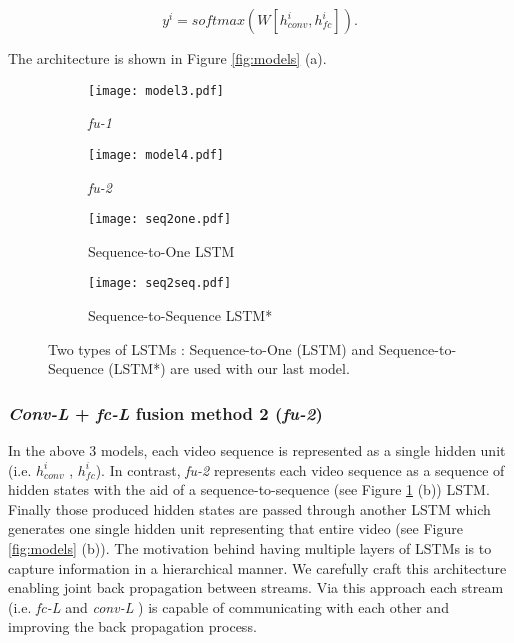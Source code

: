 \documentclass[10pt,twocolumn,letterpaper]{article}
\begin{document}
\begin{equation}
y^i=softmax( W [h^i_{conv},h^i_{fc}] ).
\label{eq:7}
\end{equation}

The architecture is shown in Figure \ref{fig:models} (a).

\begin{figure}[t!]
    \centering
    \begin{subfigure}{.45\columnwidth}
        \texttt{[image: model3.pdf]} %
        \caption{\textit{fu-1}}
    \end{subfigure}
    \begin{subfigure}{.45\columnwidth}
        \texttt{[image: model4.pdf]}
        \caption{\textit{fu-2}}
         \end{subfigure}
         \vspace{-3 mm}
         \caption{Simplified diagrams of last two models \textit{fu-1} (left) and \textit{fu-2} (right)} 
          \label{fig:models}
    \begin{subfigure}{.9\columnwidth}
        \texttt{[image: seq2one.pdf]} %
        \vspace{-5 mm}
        \caption{Sequence-to-One LSTM}
    \end{subfigure}
    \begin{subfigure}{.9\columnwidth}
        \texttt{[image: seq2seq.pdf]}
        \vspace{-2 mm}
        \caption{Sequence-to-Sequence LSTM*}
         \end{subfigure}

         \caption{Two types of LSTMs : Sequence-to-One (LSTM) and Sequence-to-Sequence (LSTM*) are used with our last model. }
        \label{fig:lstms}
\end{figure}

\subsubsection{\textit{Conv-L} + \textit{fc-L} fusion method 2 (\textit{fu-2})}

In the above 3 models, each video sequence is represented as a single hidden unit (i.e. $h^i_{conv}$ , $h^i_{fc}$). In contrast, \textit{fu-2} represents each video sequence as a sequence of hidden states with the aid of a sequence-to-sequence (see Figure \ref{fig:lstms} (b)) LSTM. Finally those produced hidden states are passed through another LSTM which generates one single hidden unit representing that entire video (see Figure \ref{fig:models} (b)). The motivation behind having multiple layers of LSTMs is to capture information in a hierarchical manner. We carefully craft this architecture enabling joint back propagation between streams. Via this approach each stream (i.e. \textit{fc-L} and \textit{conv-L} ) is capable of communicating with each other and improving the back propagation process. 
\end{document}
